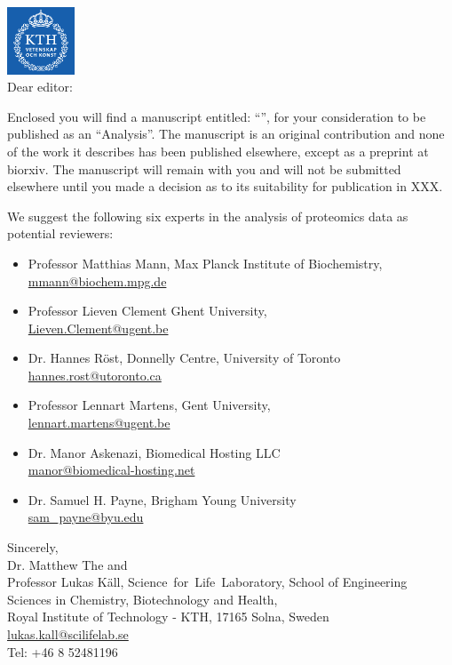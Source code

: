 \documentclass[a4paper]{letter}
\begin{document}
\begin{letter}{}
\opening{\vspace*{-3.0cm}\includegraphics[width=2cm]{img/kth_logo.png}\\[.5cm]Dear editor:}



Enclosed you will find a manuscript entitled: ``'', for your
consideration to be published as an ``Analysis''. The manuscript is an original
contribution and none of the work it describes has been published elsewhere,
except as a preprint at biorxiv. The manuscript will remain with you and will not be
submitted elsewhere until you made a decision as to its suitability for
publication in XXX.

We suggest the following six experts in the analysis of proteomics data as
potential reviewers:

\begin{itemize}

\item Professor Matthias Mann, Max Planck Institute of Biochemistry,\\
  \url{mmann@biochem.mpg.de}

\item Professor Lieven Clement
Ghent University, \\
\url{Lieven.Clement@ugent.be}

\item Dr. Hannes R\"{o}st, Donnelly Centre, University of Toronto\\
\url{hannes.rost@utoronto.ca}

\item Professor Lennart Martens,
Gent University, \\
\url{lennart.martens@ugent.be}

\item Dr. Manor Askenazi, Biomedical Hosting LLC\\
\url{manor@biomedical-hosting.net}

\item Dr. Samuel H. Payne, Brigham Young University\\
\url{sam_payne@byu.edu}

\end{itemize}

\vspace*{1.5em}

Sincerely,\\[2em]
Dr. Matthew The and\\
Professor Lukas K\"all, Science~for~Life~Laboratory, School of
Engineering Sciences in Chemistry, Biotechnology and Health,\\
Royal Institute of Technology - KTH, 17165 Solna, Sweden\\
\url{lukas.kall@scilifelab.se}\\
Tel: +46 8 52481196

\end{letter}
\end{document}
